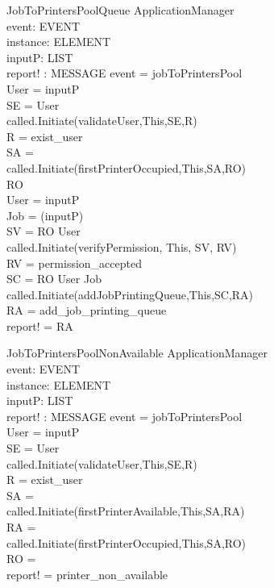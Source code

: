 \begin{schema}{JobToPrintersPoolQueue}
\Delta ApplicationManager \\
event: EVENT \\
instance: ELEMENT \\
inputP: LIST \\
report! : MESSAGE
\where event = jobToPrintersPool \\
User = \head inputP \\
SE = \lseq User \rseq \\
called.Initiate(validateUser,This,SE,R) \\
R = exist\_user \\
SA = \lseq  \rseq \\
called.Initiate(firstPrinterOccupied,This,SA,RO) \\
RO \neq \emptyset \\
User = \head inputP \\
Job = \head (\tail inputP) \\

SV = \lseq RO User \rseq \\
called.Initiate(verifyPermission, This, SV, RV) \\
RV = permission\_accepted \\

SC = \lseq RO User Job \rseq \\
called.Initiate(addJobPrintingQueue,This,SC,RA) \\
RA = add\_job\_printing\_queue \\
report! = RA
\end{schema}

\begin{schema}{JobToPrintersPoolNonAvailable}
\Delta ApplicationManager \\
event: EVENT \\
instance: ELEMENT \\
inputP: LIST \\
report! : MESSAGE
\where event = jobToPrintersPool \\
User = \head inputP \\
SE = \lseq User \rseq \\
called.Initiate(validateUser,This,SE,R) \\
R = exist\_user \\
SA = \lseq  \rseq \\
called.Initiate(firstPrinterAvailable,This,SA,RA) \\
RA = \emptyset \\
called.Initiate(firstPrinterOccupied,This,SA,RO) \\
RO = \emptyset \\
report! = printer\_non\_available
\end{schema}

